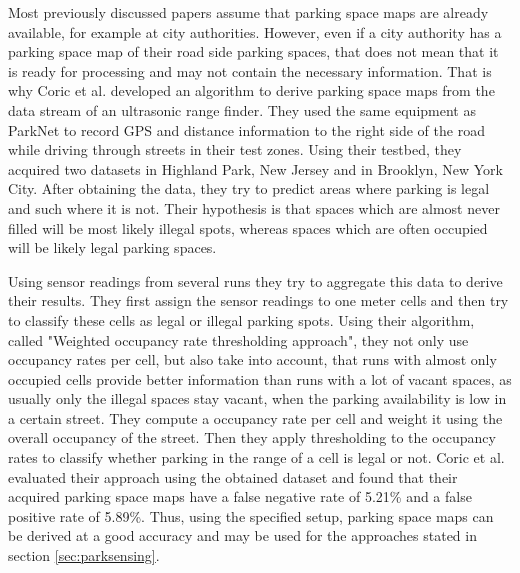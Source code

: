 Most previously discussed papers assume that parking space maps are already available, for example at city authorities. However, even if a city authority has a parking space map of their road side parking spaces, that does not mean that it is ready for processing and may not contain the necessary information. That is why Coric et al. \cite{Coric2013} developed an algorithm to derive parking space maps from the data stream of an ultrasonic range finder. They used the same equipment as ParkNet \cite{Mathur:2010:PDS:1814433.1814448} to record GPS and distance information to the right side of the road while driving through streets in their test zones. Using their testbed, they acquired two datasets in Highland Park, New Jersey and in Brooklyn, New York City. After obtaining the data, they try to predict areas where parking is legal and such where it is not. Their hypothesis is that spaces which are almost never filled will be most likely illegal spots, whereas spaces which are often occupied will be likely legal parking spaces.

Using sensor readings from several runs they try to aggregate this data to derive their results. They first assign the sensor readings to one meter cells and then try to classify these cells as legal or illegal parking spots. Using their algorithm, called "Weighted occupancy rate thresholding approach", they not only use occupancy rates per cell, but also take into account, that runs with almost only occupied cells provide better information than runs with a lot of vacant spaces, as usually only the illegal spaces stay vacant, when the parking availability is low in a certain street. They compute a occupancy rate per cell and weight it using the overall occupancy of the street. Then they apply thresholding to the occupancy rates to classify whether parking in the range of a cell is legal or not. Coric et al. evaluated their approach using the obtained dataset and found that their acquired parking space maps have a false negative rate of 5.21\% and a false positive rate of 5.89\%. Thus, using the specified setup, parking space maps can be derived at a good accuracy and may be used for the approaches stated in section
\ref{sec:parksensing}.

